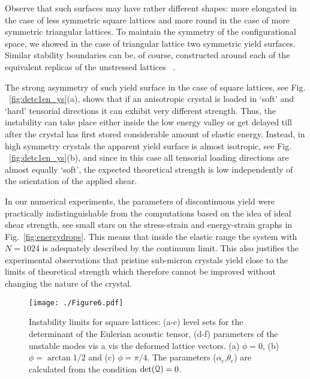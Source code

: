 \documentclass[CRPHYS,Unicode,manuscript]{cedram}
\begin{document}
% 
 
Observe that  such surfaces may have rather different shapes: more elongated   in the case of less symmetric square lattices and more round in the case of more symmetric triangular lattices. To maintain the symmetry of the configurational space, we showed in  the case of triangular lattice two symmetric yield surfaces.  Similar stability boundaries  can be, of course,  constructed around each of the equivalent replicas of the unstressed lattices ~\cite{Baggio2019-rs}.

The strong asymmetry of such   yield surface in the case of square lattices, see Fig. ~\ref{fig:detc1en_ys}(a),  shows that if an anisotropic  crystal is loaded in `soft' and `hard' tensorial directions it can  exhibit very different strength. Thus, the instability can take place either inside the low energy valley or get delayed till after the crystal has first stored   considerable amount of elastic energy. Instead,  in high symmetry crystals the apparent yield surface is almost isotropic, see Fig. ~\ref{fig:detc1en_ys}(b),  and since in this case all tensorial loading directions are almost equally `soft', the expected theoretical strength  is  low independently of the  orientation of the applied shear.

In our numerical experiments,  the   parameters  of discontinuous yield were practically indistinguishable from the computations based on the idea of ideal shear strength, see  small stars on the stress-strain and energy-strain graphs in Fig.~\ref{fig:energydrops}. This means that  inside the elastic range the system with  $N=1024$ is adequately described by the continuum limit. This also justifies the experimental  observations  that pristine sub-micron  crystals  yield close to  the limits of theoretical strength which therefore cannot be improved without changing the nature of the crystal.

\begin{figure}[h!]
\centering
\texttt{[image: ./Figure6.pdf]}
\caption{\scriptsize {Instability limits for square lattices: (a-c) level sets for the determinant of the Eulerian acoustic tensor, (d-f) parameters of the unstable modes vis a vis the deformed lattice vectors.
 (a) $\phi=0$, (b) $\phi=\arctan{1/2}$ and (c) $\phi=\pi/4$. The  parameters   ($\alpha_c$,$\theta_c$) are calculated from the condition $\det(\bold{\mathcal Q})=0$.}
\label{fig:at_sq}}
\end{figure}
\end{document}
